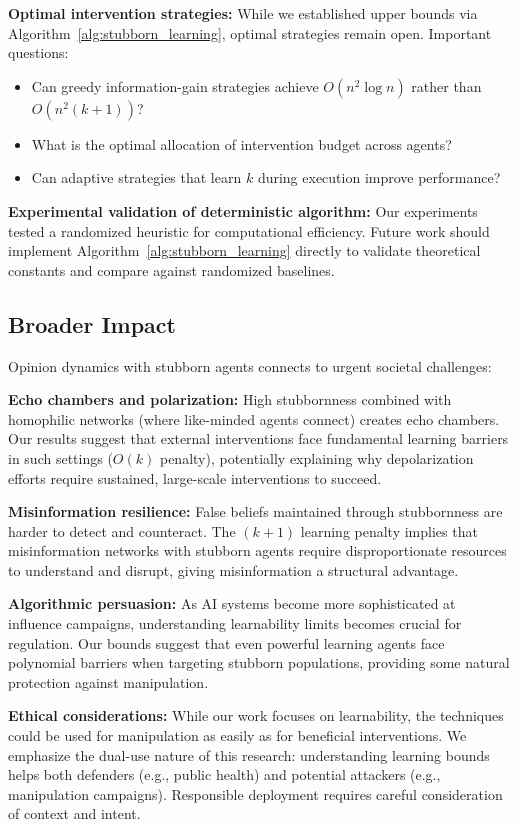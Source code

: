 \documentclass[conference]{IEEEtran}
\begin{document}
\textbf{Optimal intervention strategies:} While we established upper bounds via Algorithm~\ref{alg:stubborn_learning}, optimal strategies remain open. Important questions:
\begin{itemize}
\item Can greedy information-gain strategies achieve $O(n^2 \log n)$ rather than $O(n^2 (k+1))$?
\item What is the optimal allocation of intervention budget across agents?
\item Can adaptive strategies that learn $k$ during execution improve performance?
\end{itemize}

\textbf{Experimental validation of deterministic algorithm:} Our experiments tested a randomized heuristic for computational efficiency. Future work should implement Algorithm~\ref{alg:stubborn_learning} directly to validate theoretical constants and compare against randomized baselines.

\subsection{Broader Impact}

Opinion dynamics with stubborn agents connects to urgent societal challenges:

\textbf{Echo chambers and polarization:} High stubbornness combined with homophilic networks (where like-minded agents connect) creates echo chambers. Our results suggest that external interventions face fundamental learning barriers in such settings ($O(k)$ penalty), potentially explaining why depolarization efforts require sustained, large-scale interventions to succeed.

\textbf{Misinformation resilience:} False beliefs maintained through stubbornness are harder to detect and counteract. The $(k+1)$ learning penalty implies that misinformation networks with stubborn agents require disproportionate resources to understand and disrupt, giving misinformation a structural advantage.

\textbf{Algorithmic persuasion:} As AI systems become more sophisticated at influence campaigns, understanding learnability limits becomes crucial for regulation. Our bounds suggest that even powerful learning agents face polynomial barriers when targeting stubborn populations, providing some natural protection against manipulation.

\textbf{Ethical considerations:} While our work focuses on learnability, the techniques could be used for manipulation as easily as for beneficial interventions. We emphasize the dual-use nature of this research: understanding learning bounds helps both defenders (e.g., public health) and potential attackers (e.g., manipulation campaigns). Responsible deployment requires careful consideration of context and intent.
\end{document}
